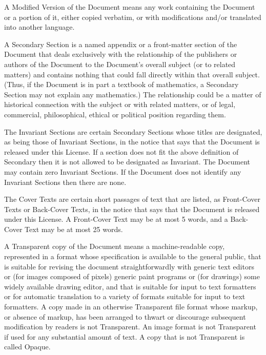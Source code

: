 \begin{noIndex}
A {\textquotedbl}Modified Version{\textquotedbl} of the Document means
any work containing the Document or a portion of it, either copied
verbatim, or with modifications and/or translated into another
language.

A {\textquotedbl}Secondary Section{\textquotedbl} is a named appendix
or a front-matter section of the Document that deals exclusively with
the relationship of the publishers or authors of the Document to the
Document's overall subject (or to related matters) and contains
nothing that could fall directly within that overall subject. (Thus,
if the Document is in part a textbook of mathematics, a Secondary
Section may not explain any mathematics.) The relationship could be a
matter of historical connection with the subject or with related
matters, or of legal, commercial, philosophical, ethical or political
position regarding them.

The {\textquotedbl}Invariant Sections{\textquotedbl} are certain
Secondary Sections whose titles are designated, as being those of
Invariant Sections, in the notice that says that the Document is
released under this License. If a section does not fit the above
definition of Secondary then it is not allowed to be designated as
Invariant. The Document may contain zero Invariant Sections. If the
Document does not identify any Invariant Sections then there are none.

The {\textquotedbl}Cover Texts{\textquotedbl} are certain short
passages of text that are listed, as Front-Cover Texts or Back-Cover
Texts, in the notice that says that the Document is released under
this License. A Front-Cover Text may be at most 5 words, and a
Back-Cover Text may be at most 25 words.

A {\textquotedbl}Transparent{\textquotedbl} copy of the Document means
a machine-readable copy, represented in a format whose specification
is available to the general public, that is suitable for revising the
document straightforwardly with generic text editors or (for images
composed of pixels) generic paint programs or (for drawings) some
widely available drawing editor, and that is suitable for input to
text formatters or for automatic translation to a variety of formats
suitable for input to text formatters. A copy made in an otherwise
Transparent file format whose markup, or absence of markup, has been
arranged to thwart or discourage subsequent modification by readers is
not Transparent. An image format is not Transparent if used for any
substantial amount of text. A copy that is not
{\textquotedbl}Transparent{\textquotedbl} is called
{\textquotedbl}Opaque{\textquotedbl}.


\end{noIndex}
